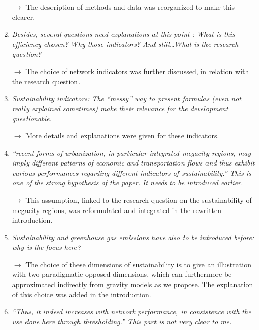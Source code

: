 \documentclass[11pt,a4paper,sans]{moderncv}        %
\begin{document}
\begin{enumerate}
$\rightarrow$ The description of methods and data was reorganized to make this clearer.

\medskip

\item \textit{Besides, several questions need explanations at this point : What is this efficiency chosen? Why those indicators? And still\ldots What is the research question?}

$\rightarrow$ The choice of network indicators was further discussed, in relation with the research question.

\medskip

\item \textit{Sustainability indicators: The ``messy'' way to present formulas (even not really explained sometimes) make their relevance for the development questionable.}

$\rightarrow$ More details and explanations were given for these indicators.

\medskip

\item \textit{``recent forms of urbanization, in particular integrated megacity regions, may imply different patterns of economic and transportation flows and thus exhibit various performances regarding different indicators of sustainability.'' This is one of the strong hypothesis of the paper. It needs to be introduced earlier.}

$\rightarrow$ This assumption, linked to the research question on the sustainability of megacity regions, was reformulated and integrated in the rewritten introduction. 


\medskip

\item \textit{Sustainability and greenhouse gas emissions have also to be introduced before: why is the focus here?}

$\rightarrow$ The choice of these dimensions of sustainability is to give an illustration with two paradigmatic opposed dimensions, which can furthermore be approximated indirectly from gravity models as we propose. The explanation of this choice was added in the introduction.

\medskip


\item \textit{``Thus, it indeed increases with network performance, in consistence with the use done here through thresholding.'' This part is not very clear to me.}


\end{enumerate}
\end{document}
